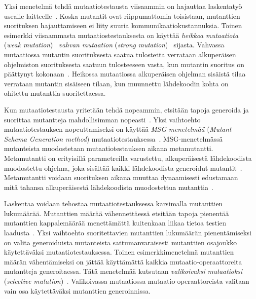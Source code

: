 \documentclass[finnish, grading]{tktltiki2}
\theoremstyle{definition}
\theoremstyle{remark}
\begin{document}
Yksi menetelmä tehdä mutaatiotestausta viisaammin on hajauttaa laskentatyö usealle laitteelle~\cite[s. 38]{Offutt:Untch:2001}. Koska mutantit ovat riippumattomia toisistaan, mutanttien suorituksen hajauttamiseen ei liity suuria kommunikaatiokustannuksia. Toinen esimerkki viisaammasta mutaatiostestauksesta on käyttää \textit{heikkoa mutaatiota} (\textit{weak mutation})~\cite[s. 37]{Offutt:Untch:2001} \textit{vahvan mutaation} (\textit{strong mutation})~\cite[s. 655]{Jia:Harman:2011} sijasta. Vahvassa mutaatiossa mutantin suorituksesta saatua tulostetta verrataan alkuperäisen ohjelmiston suorituksesta saatuun tulosteeseen vasta, kun mutantin suoritus on päättynyt kokonaan~\cite[s. 37]{Offutt:Untch:2001}. Heikossa mutaatiossa alkuperäisen ohjelman sisäistä tilaa verrataan mutantin sisäiseen tilaan, kun muunnettu lähdekoodin kohta on ohitettu mutanttia suoritettaessa.

Kun mutaatiotestausta yritetään tehdä nopeammin, etsitään tapoja generoida ja suorittaa mutantteja mahdollisimman nopeasti~\cite[s. 37]{Offutt:Untch:2001}. Yksi vaihtoehto mutaatiotestauksen nopeuttamiseksi on käyttää \textit{MSG-menetelmää} (\textit{Mutant Schema Generation method}) mutaatiotestauksessa~\cite[s. 38]{Offutt:Untch:2001}. MSG-menetelmässä mutanteista muodostetaan mutaatiotestauksen aikana metamutantti. Metamutantti on erityisillä parametreilla varustettu, alkuperäisestä lähdekoodista muodostettu ohjelma, joka sisältää kaikki lähdekoodista generoidut mutantit~\cite[s. 104]{Ma:Offutt:Kwon:2005:MuAutomated}. Metamutantti voidaan suorituksen aikana muuttaa dynaamisesti edustamaan mitä tahansa alkuperäisestä lähdekoodista muodostettua mutanttia~\cite[s. 106]{Ma:Offutt:Kwon:2005:MuAutomated}.

Laskentaa voidaan tehostaa mutaatiotestauksessa karsimalla mutanttien lukumäärää. Mutanttien määrää vähennettäessä etsitään tapoja pienentää mutanttien kappalemäärää menettämättä kuitenkaan liikaa tietoa testien laadusta~\cite[s. 37]{Offutt:Untch:2001}. Yksi vaihtoehto suoritettavien mutanttien lukumäärän pienentämiseksi on valita generoiduista mutanteista sattumanvaraisesti mutanttien osajoukko käytettäväksi mutaatiotestauksessa. Toinen esimerkkimenetelmä mutanttien määrän vähentämiseksi on jättää käyttämättä kaikkia mutaatio-operaattoreita mutantteja generoitaessa. Tätä menetelmää kutsutaan \textit{valikoivaksi mutaatioksi} (\textit{selective mutation})~\cite[s. 37]{Offutt:Untch:2001}. Valikoivassa mutaatiossa mutaatio-operaattoreista valitaan vain osa käytettäväksi mutanttien generoinnissa. 
\end{document}
